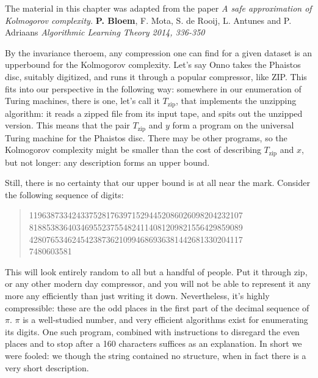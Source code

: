 \begin{summary}
The material in this chapter was adapted from the paper \emph{A safe approximation of Kolmogorov complexity.} \textbf{P. Bloem}, F. Mota, S. de Rooij, L. Antunes and P. Adriaans \emph{Algorithmic Learning Theory 2014, 336-350}
\end{summary}

By the invariance theroem, any compression one can find for a given dataset is an upperbound for the Kolmogorov complexity. Let's say Onno takes the Phaistos disc, suitably digitized, and runs it through a popular compressor, like ZIP. This fits into our perspective in the following way: somewhere in our enumeration of Turing machines, there is one, let's call it $T_\text{zip}$, that implements the unzipping algorithm: it reads a zipped file from its input tape, and spits out the unzipped version. This means that the pair $T_\text{zip}$ and $y$ form a program on the universal Turing machine for the Phaistos disc. There may be other programs, so the Kolmogorov complexity might be smaller than the cost of describing $T_\text{zip}$ and $x$, but not longer: any description forms an upper bound.


Still, there is no certainty that our upper bound is at all near the mark. Consider the following sequence of digits:
\begin{quote}
11963873342433752817639715294452086026098204232107\\
81885383640346955237554824114081209821556429859089\\
42807653462454238736210994686936381442681330204117\\
7480603581
\end{quote}

This will look entirely random to all but a handful of people. Put it through zip, or any other modern day compressor, and you will not be able to represent it any more any efficiently than just writing it down. Nevertheless, it's highly compressible: these are the odd places in the first part of the decimal sequence of $\pi$. $\pi$ is a well-studied number, and very efficient algorithms exist for enumerating its digits. One such program, combined with instructions to disregard the even places and to stop after a 160 characters suffices as an explanation. In short we were fooled: we though the string contained no structure, when in fact there is a very short description.


